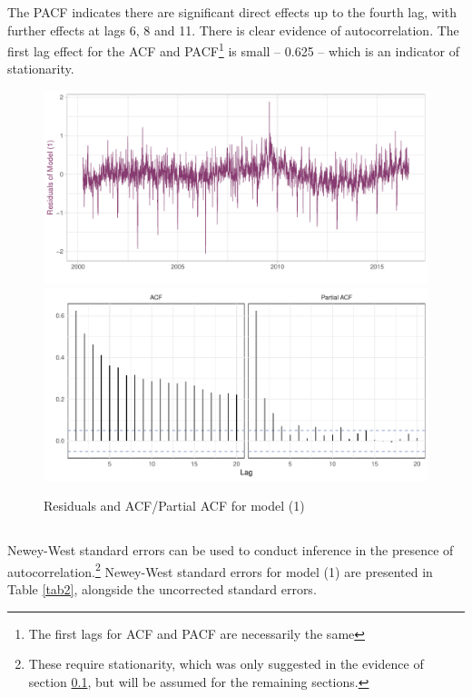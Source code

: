 \documentclass{article}\usepackage[]{graphicx}\usepackage[]{color}
\newcommand{\wnote}[1]{\vspace{-5mm} \floatfoot{\centering{\textit{Note: #1}}}}
\begin{document}
The PACF indicates there are significant direct effects up to the fourth lag, with further effects at lags 6, 8 and 11. There is clear evidence of autocorrelation. The first lag effect for the ACF and PACF\footnote{The first lags for ACF and PACF are necessarily the same} is small -- 0.625 -- which is an indicator of stationarity.

    \begin{figure}[h!]
    \caption{Residuals and ACF/Partial ACF for model (1)}
        \includegraphics[width=.9\columnwidth]{atlas/chart23resid.pdf}
        \includegraphics[width=.9\columnwidth]{atlas/chart23correl.pdf}
        \label{chart23} 
    \end{figure}  

\newpage
\subsection{} \label{subsec25} %
  



  Newey-West standard errors can be used to conduct inference in the presence of autocorrelation.\footnote{These require stationarity, which was only suggested in the evidence of section \ref{subsec25}, but will be assumed for the remaining sections.} Newey-West standard errors for model (1) are presented in Table \ref{tab2}, alongside the uncorrected standard errors. 
\end{document}
